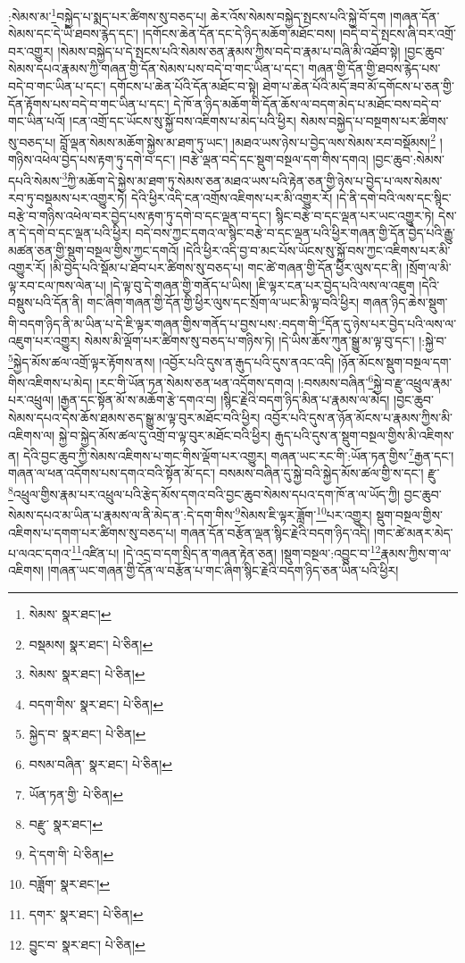 :སེམས་མ་\footnote{སེམས་  སྣར་ཐང་། }བསྐྱེད་པ་སྨད་པར་ཚིགས་སུ་བཅད་པ། ཆེར་འོས་སེམས་བསྐྱེད་སྤངས་པའི་སྐྱེ་བོ་དག །གཞན་དོན་སེམས་དང་དེ་ཡི་ཐབས་རྙེད་དང་། །དགོངས་ཆེན་དོན་དང་དེ་ཉིད་མཆོག་མཐོང་བས། །བདེ་བ་དེ་སྤངས་ཞི་བར་འགྲོ་བར་འགྱུར། །སེམས་བསྐྱེད་པ་དེ་སྤངས་པའི་སེམས་ཅན་རྣམས་ཀྱིས་བདེ་བ་རྣམ་པ་བཞི་མི་འཐོབ་སྟེ། །བྱང་ཆུབ་སེམས་དཔའ་རྣམས་ཀྱི་གཞན་གྱི་དོན་སེམས་པས་བདེ་བ་གང་ཡིན་པ་དང་། གཞན་གྱི་དོན་གྱི་ཐབས་རྙེད་པས་བདེ་བ་གང་ཡིན་པ་དང་། དགོངས་པ་ཆེན་པོའི་དོན་མཐོང་བ་སྟེ། ཐེག་པ་ཆེན་པོའི་མདོ་ཟབ་མོ་དགོངས་པ་ཅན་གྱི་དོན་རྟོགས་པས་བདེ་བ་གང་ཡིན་པ་དང་། དེ་ཁོ་ན་ཉིད་མཆོག་གི་དོན་ཆོས་ལ་བདག་མེད་པ་མཐོང་བས་བདེ་བ་གང་ཡིན་པའོ། །ངན་འགྲོ་དང་ཡོངས་སུ་སྐྱོ་བས་འཇིགས་པ་མེད་པའི་ཕྱིར། སེམས་བསྐྱེད་པ་བསྔགས་པར་ཚིགས་སུ་བཅད་པ། བློ་ལྡན་སེམས་མཆོག་སྐྱེས་མ་ཐག་ཏུ་ཡང་། །མཐའ་ཡས་ཉེས་པ་བྱེད་ལས་སེམས་རབ་བསྡོམས།\footnote{བསྡམས།  སྣར་ཐང་།  པེ་ཅིན། } །གཉིས་འཕེལ་བྱེད་པས་རྟག་ཏུ་དགེ་བ་དང་། །བརྩེ་ལྡན་བདེ་དང་སྡུག་བསྔལ་དག་གིས་དགའ། །བྱང་ཆུབ་:སེམས་དཔའི་སེམས་\footnote{སེམས་  སྣར་ཐང་།  པེ་ཅིན། }ཀྱི་མཆོག་དེ་སྐྱེས་མ་ཐག་ཏུ་སེམས་ཅན་མཐའ་ཡས་པའི་རྟེན་ཅན་གྱི་ཉེས་པ་བྱེད་པ་ལས་སེམས་རབ་ཏུ་བསྡམས་པར་འགྱུར་ཏེ། དེའི་ཕྱིར་འདི་ངན་འགྲོས་འཇིགས་པར་མི་འགྱུར་རོ། །དེ་ནི་དགེ་བའི་ལས་དང་སྙིང་བརྩེ་བ་གཉིས་འཕེལ་བར་བྱེད་པས་རྟག་ཏུ་དགེ་བ་དང་ལྡན་བ་དང་། སྙིང་བརྩེ་བ་དང་ལྡན་པར་ཡང་འགྱུར་ཏེ། དེས་ན་དེ་དགེ་བ་དང་ལྡན་པའི་ཕྱིར། བདེ་བས་ཀྱང་དགའ་ལ་སྙིང་བརྩེ་བ་དང་ལྡན་པའི་ཕྱིར་གཞན་གྱི་དོན་བྱེད་པའི་རྒྱུ་མཚན་ཅན་གྱི་སྡུག་བསྔལ་གྱིས་ཀྱང་དགའོ། །དེའི་ཕྱིར་འདི་བྱ་བ་མང་པོས་ཡོངས་སུ་སྐྱོ་བས་ཀྱང་འཇིགས་པར་མི་འགྱུར་རོ། །མི་བྱེད་པའི་སྡོམ་པ་ཐོབ་པར་ཚིགས་སུ་བཅད་པ། གང་ཚེ་གཞན་གྱི་དོན་ཕྱིར་ལུས་དང་ནི། །སྲོག་ལ་མི་ལྟ་རབ་ངལ་ཁས་ལེན་པ། །དེ་ལྟ་བུ་དེ་གཞན་གྱི་གནོད་པ་ཡིས། །ཇི་ལྟར་ངན་པར་བྱེད་པའི་ལས་ལ་འཇུག །དེའི་བསྡུས་པའི་དོན་ནི། གང་ཞིག་གཞན་གྱི་དོན་གྱི་ཕྱིར་ལུས་དང་སྲོག་ལ་ཡང་མི་ལྟ་བའི་ཕྱིར། གཞན་ཉིད་ཆེས་སྡུག་གི་བདག་ཉིད་ནི་མ་ཡིན་པ་དེ་ཇི་ལྟར་གཞན་གྱིས་གནོད་པ་བྱས་པས་:བདག་གི་\footnote{བདག་གིས་  སྣར་ཐང་།  པེ་ཅིན། }དོན་དུ་ཉེས་པར་བྱེད་པའི་ལས་ལ་འཇུག་པར་འགྱུར། སེམས་མི་ལྡོག་པར་ཚིགས་སུ་བཅད་པ་གཉིས་ཏེ། །དེ་ཡིས་ཆོས་ཀུན་སྒྱུ་མ་ལྟ་བུ་དང་། །:སྐྱེ་བ་\footnote{སྐྱེད་བ་  སྣར་ཐང་།  པེ་ཅིན། }སྐྱེད་མོས་ཚལ་འགྲོ་ལྟར་རྟོགས་ནས། །འབྱོར་པའི་དུས་ན་རྒུད་པའི་དུས་ནའང་འདི། །ཉོན་མོངས་སྡུག་བསྔལ་དག་གིས་འཇིགས་པ་མེད། །རང་གི་ཡོན་ཏན་སེམས་ཅན་ཕན་འདོགས་དགའ། །:བསམས་བཞིན་\footnote{བསམ་བཞིན་  སྣར་ཐང་།  པེ་ཅིན། }སྐྱེ་བ་རྫུ་འཕྲུལ་རྣམ་པར་འཕྲུལ། །རྒྱན་དང་སྟོན་མོ་ས་མཆོག་རྩེ་དགའ་བ། །སྙིང་རྗེའི་བདག་ཉིད་མིན་པ་རྣམས་ལ་མེད། །བྱང་ཆུབ་སེམས་དཔའ་དེས་ཆོས་ཐམས་ཅད་སྒྱུ་མ་ལྟ་བུར་མཐོང་བའི་ཕྱིར། འབྱོར་པའི་དུས་ན་ཉོན་མོངས་པ་རྣམས་ཀྱིས་མི་འཇིགས་ལ། སྐྱེ་བ་སྐྱེད་མོས་ཚལ་དུ་འགྲོ་བ་ལྟ་བུར་མཐོང་བའི་ཕྱིར། རྒུད་པའི་དུས་ན་སྡུག་བསྔལ་གྱིས་མི་འཇིགས་ན། དེའི་བྱང་ཆུབ་ཀྱི་སེམས་འཇིགས་པ་གང་གིས་ལྡོག་པར་འགྱུར། གཞན་ཡང་རང་གི་:ཡོན་ཏན་གྱིས་\footnote{ཡོན་ཏན་གྱི་  པེ་ཅིན། }རྒྱན་དང་། གཞན་ལ་ཕན་འདོགས་པས་དགའ་བའི་སྟོན་མོ་དང་། བསམས་བཞིན་དུ་སྐྱེ་བའི་སྐྱེད་མོས་ཚལ་གྱི་ས་དང་། རྫུ་\footnote{བརྫུ་  སྣར་ཐང་། }འཕྲུལ་གྱིས་རྣམ་པར་འཕྲུལ་པའི་རྩེད་མོས་དགའ་བའི་བྱང་ཆུབ་སེམས་དཔའ་དག་ཁོ་ན་ལ་ཡོད་ཀྱི། བྱང་ཆུབ་སེམས་དཔའ་མ་ཡིན་པ་རྣམས་ལ་ནི་མེད་ན་:དེ་དག་གིས་\footnote{དེ་དག་གི་  པེ་ཅིན། }སེམས་ཇི་ལྟར་ཟློག་\footnote{བཟློག་  སྣར་ཐང་། }པར་འགྱུར། སྡུག་བསྔལ་གྱིས་འཇིགས་པ་དགག་པར་ཚིགས་སུ་བཅད་པ། གཞན་དོན་བརྩོན་ལྡན་སྙིང་རྗེའི་བདག་ཉིད་འདི། །གང་ཚེ་མནར་མེད་པ་ལའང་དགའ་\footnote{དགར་  སྣར་ཐང་།  པེ་ཅིན། }འཛིན་པ། །དེ་འདྲ་བ་དག་སྲིད་ན་གཞན་རྟེན་ཅན། །སྡུག་བསྔལ་:འབྱུང་བ་\footnote{བྱུང་བ་  སྣར་ཐང་།  པེ་ཅིན། }རྣམས་ཀྱིས་ག་ལ་འཇིགས། །གཞན་ཡང་གཞན་གྱི་དོན་ལ་བརྩོན་པ་གང་ཞིག་སྙིང་རྗེའི་བདག་ཉིད་ཅན་ཡིན་པའི་ཕྱིར། 